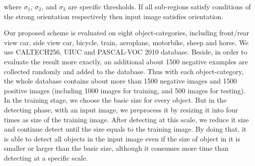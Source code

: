 where $\sigma_1$, $\sigma_2$, and $\sigma_3$ are specific thresholds. If all sub-regions satisfy
conditions of the strong orientation respectively then input image
satisfies orientation.

Our proposed scheme is evaluated on eight object-categories,
including front/rear view car, side view car, bicycle, train, aeroplane,
motorbike, sheep and horse. We use CALTECH256, UIUC and
PASCAL-VOC 2010 database. Beside, in order to evaluate the result
more exactly, an additional about 1500 negative examples are
collected randomly and added to the database. Thus with each
object-category, the whole database contains about more than 1500
negative images and 1500 positive images (including 1000 images
for training, and 500 images for testing).
In the training stage, we choose the basic size for every object. But in the detecting
phase, with an input image, we preprocess it by resizing it into four
times as size of the training image. After detecting at this scale, we reduce it size and continue detect
until the size equals to the training image. By doing that, it is able to
detect all objects in the input image even if the size of object in it is
smaller or larger than the basic size, although it consumes more time
than detecting at a specific scale.
